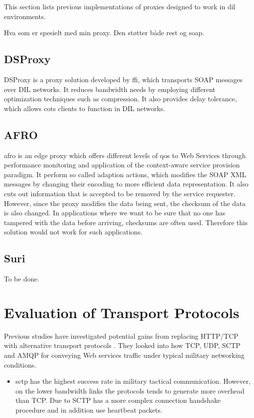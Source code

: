 This section lists previous implementations of proxies designed to work in
\gls{dil} environments.

Hva som er spesielt med min proxy. Den støtter både rest og soap.

\subsection{DSProxy}

DSProxy is a proxy solution developed by \gls{ffi}, which transports SOAP
messages over DIL networks. It reduces bandwidth needs by employing different
optimization techniques such as compression. It also provides delay tolerance,
which allows \gls{cots} clients to function in DIL networks.


\subsection{AFRO}

\gls{afro} is an edge proxy which offers different levels of \gls{qos} to Web
Services through performance monitoring and application of the context-aware
service provision paradigm. It perform so called adaption actions, which
modifies the SOAP XML messages by changing their encoding to more efficient data
representation. It also cuts out information that is accepted to be removed by
the service requester. However, since the proxy modifies the data being sent,
the checksum of the data is also changed. In applications where we want to be
sure that no one has tampered with the data before arriving, checksums are often
used. Therefore this solution would not work for such applications.


\subsection{Suri}
To be done.

\section{Evaluation of Transport Protocols}

Previous studies have investigated potential gains from replacing HTTP/TCP
with alternative transport protocols
\cite{evaluation-transport-protocols-web-services}. They looked into how TCP,
UDP, SCTP and AMQP for conveying Web services traffic under typical military
networking conditions.

\begin{itemize}
    \item \gls{sctp} has the highest success rate in military tactical
    communication. However, on the lower bandwidth links the protocols tends to
     generate more overhead than TCP. Due to SCTP has a more complex connection
     handshake procedure and in addition use heartbeat packets.
\end{itemize}


